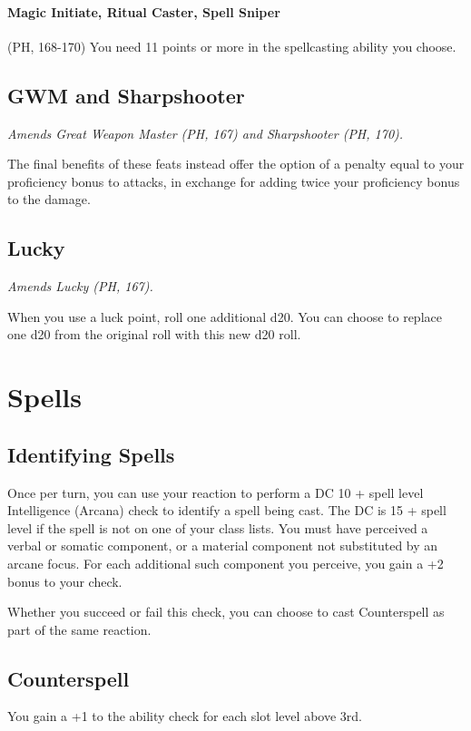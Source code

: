 \documentclass[House_Rules.tex]{subfiles}
\begin{document}
\paragraph{Magic Initiate, Ritual Caster, Spell Sniper} (PH, 168-170) You need 11 points or more in the spellcasting ability you choose.

\subsection{GWM and Sharpshooter}
\textit{Amends Great Weapon Master (PH, 167) and Sharpshooter (PH, 170).}

The final benefits of these feats instead offer the option of a penalty equal to your proficiency bonus to attacks, in exchange for adding twice your proficiency bonus to the damage.

\subsection{Lucky}
\textit{Amends Lucky (PH, 167).}

When you use a luck point, roll one additional d20. You can choose to replace one d20 from the original roll with this new d20 roll.




\section{Spells}

\subsection{Identifying Spells}
Once per turn, you can use your reaction to perform a DC 10 + spell level Intelligence (Arcana) check to identify a spell being cast. The DC is 15 + spell level if the spell is not on one of your class lists. You must have perceived a verbal or somatic component, or a material component not substituted by an arcane focus. For each additional such component you perceive, you gain a +2 bonus to your check.

Whether you succeed or fail this check, you can choose to cast Counterspell as part of the same reaction.

\subsection{Counterspell}
You gain a +1 to the ability check for each slot level above 3rd.
\end{document}
